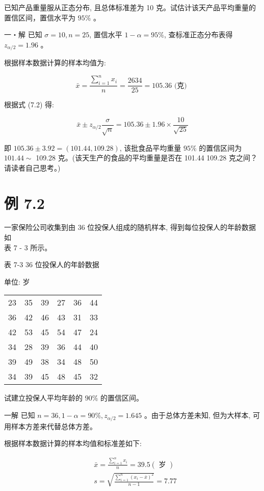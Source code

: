 \documentclass[10pt]{article}
\begin{document}
\begin{CJK*}{UTF8}{bsmi}
已知产品重量服从正态分布, 且总体标准差为 10 克。试估计该天产品平均重量的置信区间，置信水平为 $95 \%$ 。

一・解 已知 $\sigma=10, n=25$, 置信水平 $1-\alpha=95 \%$, 查标准正态分布表得 $z_{\alpha / 2}=1.96$ 。

根据样本数据计算的样本均值为:

$$
\bar{x}=\frac{\sum_{i=1}^{n} x_{i}}{n}=\frac{2634}{25}=105.36 \text { (克) }
$$

根据式 (7.2) 得:

$$
\bar{x} \pm z_{\alpha / 2} \frac{\sigma}{\sqrt{n}}=105.36 \pm 1.96 \times \frac{10}{\sqrt{25}}
$$

即 $105.36 \pm 3.92=(101.44,109.28)$, 该批食品平均重量 $95 \%$ 的置信区间为 $101.44 \sim$ 109.28 克。(该天生产的食品的平均重量是否在 101.44 109.28 克之间？请读者自己思考。)

\section*{例 7.2}
一家保险公司收集到由 36 位投保人组成的随机样本, 得到每位投保人的年龄数据如\\
表 7 - 3 所示。

表 7-3 36 位投保人的年龄数据

单位: 岁

\begin{center}
\begin{tabular}{llllll}
\hline
23 & 35 & 39 & 27 & 36 & 44 \\
36 & 42 & 46 & 43 & 31 & 33 \\
42 & 53 & 45 & 54 & 47 & 24 \\
34 & 28 & 39 & 36 & 44 & 40 \\
39 & 49 & 38 & 34 & 48 & 50 \\
34 & 39 & 45 & 48 & 45 & 32 \\
\hline
\end{tabular}
\end{center}

试建立投保人平均年龄的 $90 \%$ 的置信区间。

一解 已知 $n=36,1-\alpha=90 \%, z_{\alpha / 2}=1.645$ 。由于总体方差未知, 但为大样本, 可用样本方差来代替总体方差。

根据样本数据计算的样本均值和标准差如下:

$$
\begin{aligned}
& \bar{x}=\frac{\sum_{i=1}^{n} x_{i}}{n}=39.5(\text { 岁 }) \\
& s=\sqrt{\frac{\sum_{i=1}^{n}\left(x_{i}-\bar{x}\right)^{2}}{n-1}}=7.77
\end{aligned}
$$


\end{CJK*}
\end{document}
